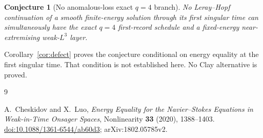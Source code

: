\documentclass[11pt]{article}
\newtheorem{conjecture}[theorem]{Conjecture}
\theoremstyle{remark}
\begin{document}
\begin{conjecture}[No anomalous-loss exact \(q=4\) branch]
No Leray--Hopf continuation of a smooth finite-energy solution through
its first singular time can simultaneously have the exact \(q=4\)
first-record schedule and a fixed-energy near-extremising weak-\(L^3\)
layer.
\end{conjecture}

Corollary~\ref{cor:defect} proves the conjecture conditional on energy
equality at the first singular time.  That condition is not established
here.  No Clay alternative is proved.

\begin{thebibliography}{9}

A.~Cheskidov and X.~Luo,
\emph{Energy Equality for the Navier--Stokes Equations in Weak-in-Time
Onsager Spaces},
Nonlinearity \textbf{33} (2020), 1388--1403.
\href{https://doi.org/10.1088/1361-6544/ab60d3}
{doi:10.1088/1361-6544/ab60d3};
arXiv:1802.05785v2.

\end{thebibliography}
\end{document}
